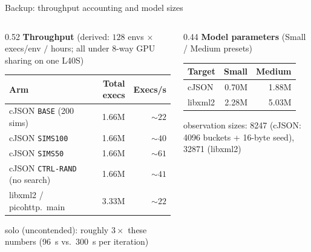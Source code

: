 \documentclass[aspectratio=169,10pt]{beamer}
\newcommand{\arm}[1]{\texttt{#1}}
\begin{document}
\begin{frame}{Backup: throughput accounting and model sizes}
  \begin{columns}[T]
    \begin{column}{0.52\textwidth}
      \textbf{Throughput} (derived: $128$ envs $\times$ execs/env $/$ hours;
      all under 8-way GPU sharing on one L40S)
      \smallskip

      \footnotesize
      \begin{tabular}{@{}lrr@{}}
        \toprule
        Arm & Total execs & Execs/s \\
        \midrule
        cJSON \arm{BASE} (200 sims) & 1.66M & ${\sim}22$ \\
        cJSON \arm{SIMS100} & 1.66M & ${\sim}40$ \\
        cJSON \arm{SIMS50} & 1.66M & ${\sim}61$ \\
        cJSON \arm{CTRL-RAND} (no search) & 1.66M & ${\sim}41$ \\
        libxml2 / picohttp.\ main & 3.33M & ${\sim}22$ \\
        \bottomrule
      \end{tabular}

      \smallskip
      \normalsize solo (uncontended): roughly $3\times$ these numbers
      (\SI{96}{\second} vs.\ \SI{300}{\second} per iteration)
    \end{column}
    \begin{column}{0.44\textwidth}
      \textbf{Model parameters} (Small / Medium presets)
      \smallskip

      \footnotesize
      \begin{tabular}{@{}lrr@{}}
        \toprule
        Target & Small & Medium \\
        \midrule
        cJSON & 0.70M & 1.88M \\
        libxml2 & 2.28M & 5.03M \\
        \bottomrule
      \end{tabular}

      \smallskip
      \normalsize observation sizes: \num{8247} (cJSON:
      \num{4096} buckets + 16-byte seed), \num{32871} (libxml2)
    \end{column}
  \end{columns}
\end{frame}
\end{document}
